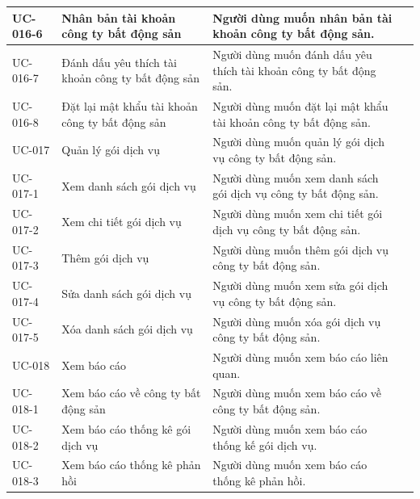 \documentclass[12pt,a4paper]{article}
\begin{document}
\begin{center}
\begin{longtable}{|p{2.5cm}|p{4.5cm}|p{7.5cm}|c|}
            UC-016-6
            & Nhân bản tài khoản công ty bất động sản
            & Người dùng muốn nhân bản tài khoản công ty bất động sản.
            \\ \hline
            UC-016-7
            & Đánh dấu yêu thích tài khoản công ty bất động sản
            & Người dùng muốn đánh dấu yêu thích tài khoản công ty bất động sản.
            \\ \hline
            UC-016-8
            & Đặt lại mật khẩu tài khoản công ty bất động sản
            & Người dùng muốn đặt lại mật khẩu tài khoản công ty bất động sản.
            \\ \hline
            UC-017
            & Quản lý gói dịch vụ
            & Người dùng muốn quản lý gói dịch vụ công ty bất động sản.
            \\ \hline
            UC-017-1
            & Xem danh sách gói dịch vụ
            & Người dùng muốn xem danh sách gói dịch vụ công ty bất động sản.
            \\ \hline
            UC-017-2
            & Xem chi tiết gói dịch vụ
            & Người dùng muốn xem chi tiết gói dịch vụ công ty bất động sản.
            \\ \hline
            UC-017-3
            & Thêm gói dịch vụ
            & Người dùng muốn thêm gói dịch vụ công ty bất động sản.
            \\ \hline
            UC-017-4
            & Sửa danh sách gói dịch vụ
            & Người dùng muốn xem sửa gói dịch vụ công ty bất động sản.
            \\ \hline
            UC-017-5
            & Xóa danh sách gói dịch vụ
            & Người dùng muốn xóa gói dịch vụ công ty bất động sản.
            \\ \hline
            UC-018
            & Xem báo cáo
            & Người dùng muốn xem báo cáo liên quan.
            \\ \hline
            UC-018-1
            & Xem báo cáo về công ty bất động sản
            & Người dùng muốn xem báo cáo về công ty bất động sản.
            \\ \hline
            UC-018-2
            & Xem báo cáo thống kê gói dịch vụ
            & Người dùng muốn xem báo cáo thống kế gói dịch vụ.
            \\ \hline
            UC-018-3
            & Xem báo cáo thống kê phản hồi
            & Người dùng muốn xem báo cáo thống kê phản hồi.
            \\ \hline

\end{longtable}
\end{center}
\end{document}
